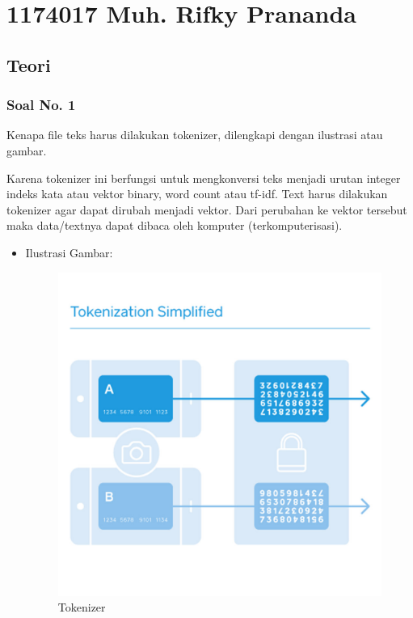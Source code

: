 \section{1174017 Muh. Rifky Prananda}
\subsection{Teori}
\subsubsection{Soal No. 1}
Kenapa file teks harus dilakukan tokenizer, dilengkapi dengan ilustrasi atau gambar.

Karena tokenizer ini berfungsi untuk mengkonversi teks menjadi urutan integer indeks kata atau vektor binary, word count atau tf-idf. Text harus dilakukan tokenizer agar dapat dirubah menjadi vektor. Dari perubahan ke vektor tersebut maka data/textnya dapat dibaca oleh komputer (terkomputerisasi).

\begin{itemize}
\item Ilustrasi Gambar:

\begin{figure}[!hbtp]
\centering
\includegraphics[scale=0.2]{figures/1174017/7/1.jpg}
\caption{Tokenizer}
\end{figure}

\end{itemize}

